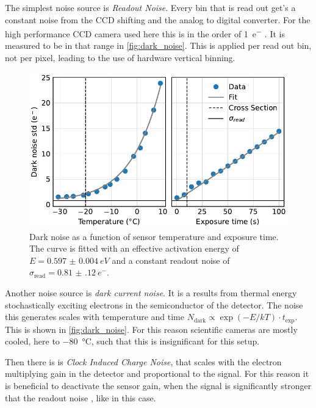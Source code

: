 \documentclass[
	parskip=half,
	a4paper,
]{scrarticle}
\begin{document}
The simplest noise source is \textit{Readout Noise}. Every bin that is read out get's a constant noise from the CCD shifting and the analog to digital converter. For the high performance CCD camera used here this is in the order of \SI{1}{e^-} \cite{andor_ixonem_nodate}. It is measured to be in that range in \autoref{fig:dark_noise}.
This is applied per read out bin, not per pixel, leading to the use of hardware vertical binning.

\begin{figure}[hb]
    \centering
    \includegraphics{../analysis/figures/dark_noise.pdf}
    \caption{Dark noise as a function of sensor temperature and exposure time. The curve is fitted with an effective activation energy of $E = \SI{0.597(4)}{eV}$ and a constant readout noise of $\sigma_{\text{read}} = \SI{0.81(12)}{e^-}$.}
    \label{fig:dark_noise}
\end{figure}
Another noise source is \textit{dark current noise}. 
It is a results from thermal energy stochastically exciting electrons in the semiconductor of the detector. The noise this generates scales with temperature and time $N_\text{dark} \propto \exp(-E / k T) \cdot t_\text{exp}$. This is shown in \autoref{fig:dark_noise}.
For this reason scientific cameras are mostly cooled, here to \SI{-80}{\degreeCelsius}, such that this is insignificant for this setup.


Then there is is \textit{Clock Induced Charge Noise}, that scales with the electron multiplying gain in the detector and proportional to the signal. For this reason it is beneficial to deactivate the sensor gain, when the signal is significantly stronger that the readout noise \cite{andor_establishing_nodate}, like in this case.
\end{document}
